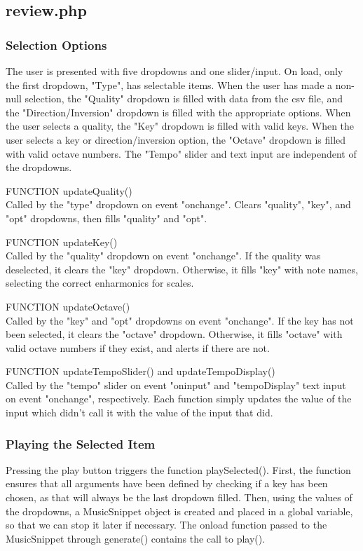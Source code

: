 \documentclass{article}
\begin{document}
\subsection{review.php}

\subsubsection{Selection Options}
The user is presented with five dropdowns and one slider/input.  On load, only the first dropdown, "Type", has selectable items.  When the user has made a non-null selection, the "Quality" dropdown is filled with data from the csv file, and the "Direction/Inversion" dropdown is filled with the appropriate options.  When the user selects a quality, the "Key" dropdown is filled with valid keys.  When the user selects a key or direction/inversion option, the "Octave" dropdown is filled with valid octave numbers.  The "Tempo" slider and text input are independent of the dropdowns.

\vskip 3mm
FUNCTION updateQuality()
\\
Called by the "type" dropdown on event "onchange".  Clears "quality", "key", and "opt" dropdowns, then fills "quality" and "opt".

\vskip 3mm
FUNCTION updateKey()
\\
Called by the "quality" dropdown on event "onchange".  If the quality was deselected, it clears the "key" dropdown.  Otherwise, it fills "key" with note names, selecting the correct enharmonics for scales.

\vskip 3mm
FUNCTION updateOctave()
\\
Called by the "key" and "opt" dropdowns on event "onchange".  If the key has not been selected, it clears the "octave" dropdown.  Otherwise, it fills "octave" with valid octave numbers if they exist, and alerts if there are not.

\vskip 3mm
FUNCTION updateTempoSlider() and updateTempoDisplay()
\\
Called by the "tempo" slider on event "oninput" and "tempoDisplay" text input on event "onchange", respectively.  Each function simply updates the value of the input which didn't call it with the value of the input that did.

\subsubsection{Playing the Selected Item}
Pressing the play button triggers the function playSelected().  
First, the function ensures that all arguments have been defined by checking if a key has been chosen, as that will always be the last dropdown filled.  
Then, using the values of the dropdowns, a MusicSnippet object is created and placed in a global variable, so that we can stop it later if necessary.  
The onload function passed to the MusicSnippet through generate() contains the call to play().
\end{document}
